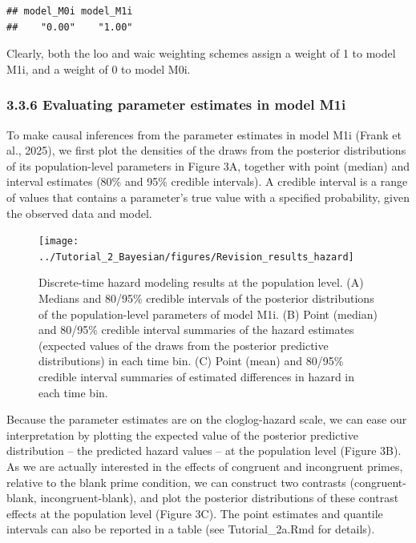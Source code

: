 \documentclass[
  man, donotrepeattitle,floatsintext]{apa6}
\begin{document}
\begin{verbatim}
## model_M0i model_M1i 
##    "0.00"    "1.00"
\end{verbatim}

\normalsize

Clearly, both the loo and waic weighting schemes assign a weight of 1 to model M1i, and a weight of 0 to model M0i.

\subsubsection{3.3.6 Evaluating parameter estimates in model M1i}\label{evaluating-parameter-estimates-in-model-m1i}

To make causal inferences from the parameter estimates in model M1i (Frank et al., 2025), we first plot the densities of the draws from the posterior distributions of its population-level parameters in Figure 3A, together with point (median) and interval estimates (80\% and 95\% credible intervals). A credible interval is a range of values that contains a parameter's true value with a specified probability, given the observed data and model.



\begin{figure}[H]

{\centering \texttt{[image: ../Tutorial\_2\_Bayesian/figures/Revision\_results\_hazard]} 

}

\caption{Discrete-time hazard modeling results at the population level. (A) Medians and 80/95\% credible intervals of the posterior distributions of the population-level parameters of model M1i. (B) Point (median) and 80/95\% credible interval summaries of the hazard estimates (expected values of the draws from the posterior predictive distributions) in each time bin. (C) Point (mean) and 80/95\% credible interval summaries of estimated differences in hazard in each time bin.}\label{fig:plot-fixed-effects}
\end{figure}

Because the parameter estimates are on the cloglog-hazard scale, we can ease our interpretation by plotting the expected value of the posterior predictive distribution -- the predicted hazard values -- at the population level (Figure 3B). As we are actually interested in the effects of congruent and incongruent primes, relative to the blank prime condition, we can construct two contrasts (congruent-blank, incongruent-blank), and plot the posterior distributions of these contrast effects at the population level (Figure 3C). The point estimates and quantile intervals can also be reported in a table (see Tutorial\_2a.Rmd for details).
\end{document}
